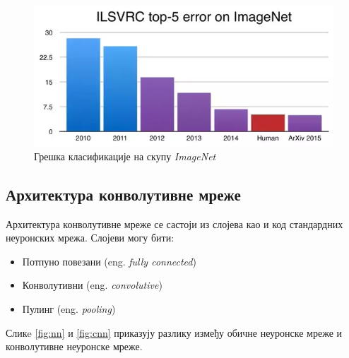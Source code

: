 \documentclass[a4paper]{article}
\begin{document}
\begin{figure}[h!]
\begin{center}
    \includegraphics[width=\textwidth]{resources/ilsvrc.png}
\end{center}
\caption{Грешка класификације на скупу \textit{ImageNet}}
\label{fig:imgneterror}
\end{figure}


\subsection{Архитектура конволутивне мреже}
Архитектура конволутивне мреже се састоји из слојева као и код стандардних неуронских мрежа.
Слојеви могу бити:
\begin{itemize}
	\item Потпуно повезани (eng. \textit{fully connected})
	\item Конволутивни (eng. \textit{convolutive})
	\item Пулинг (eng. \textit{pooling})
\end{itemize}

Сликe \ref{fig:nn} и \ref{fig:cnn} приказују разлику између обичне неуронске мреже и конволутивне неуронске мреже.

\label{subsec:arch}
\end{document}
